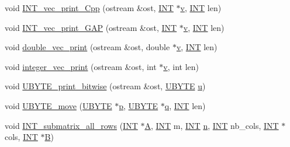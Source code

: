 \begin{DoxyCompactItemize}
\item 
void \mbox{\hyperlink{util_8_c_ad19ad515398f223bb537e4645d0a3094}{I\+N\+T\+\_\+vec\+\_\+print\+\_\+\+Cpp}} (ostream \&ost, \mbox{\hyperlink{galois_8h_a09fddde158a3a20bd2dcadb609de11dc}{I\+NT}} $\ast$\mbox{\hyperlink{simeon_8_c_aeb3f3030944801b163bc3b829a7f6710}{v}}, \mbox{\hyperlink{galois_8h_a09fddde158a3a20bd2dcadb609de11dc}{I\+NT}} len)
\item 
void \mbox{\hyperlink{util_8_c_ae2cc7aa118a0fc36468c296c4e7440f6}{I\+N\+T\+\_\+vec\+\_\+print\+\_\+\+G\+AP}} (ostream \&ost, \mbox{\hyperlink{galois_8h_a09fddde158a3a20bd2dcadb609de11dc}{I\+NT}} $\ast$\mbox{\hyperlink{simeon_8_c_aeb3f3030944801b163bc3b829a7f6710}{v}}, \mbox{\hyperlink{galois_8h_a09fddde158a3a20bd2dcadb609de11dc}{I\+NT}} len)
\item 
void \mbox{\hyperlink{util_8_c_a769d593927060ae1885b4a72aa296048}{double\+\_\+vec\+\_\+print}} (ostream \&ost, double $\ast$\mbox{\hyperlink{simeon_8_c_aeb3f3030944801b163bc3b829a7f6710}{v}}, \mbox{\hyperlink{galois_8h_a09fddde158a3a20bd2dcadb609de11dc}{I\+NT}} len)
\item 
void \mbox{\hyperlink{util_8_c_a180b6872d1a599495f3fec2f0949ec15}{integer\+\_\+vec\+\_\+print}} (ostream \&ost, int $\ast$\mbox{\hyperlink{simeon_8_c_aeb3f3030944801b163bc3b829a7f6710}{v}}, int len)
\item 
void \mbox{\hyperlink{util_8_c_a920069ee78174f219534fed767865637}{U\+B\+Y\+T\+E\+\_\+print\+\_\+bitwise}} (ostream \&ost, \mbox{\hyperlink{galois_8h_a122c4acf389c050379f00341fdcd5812}{U\+B\+Y\+TE}} \mbox{\hyperlink{alphabet2_8_c_a5874b4c2ec2e28321eea4e4871d08222}{u}})
\item 
void \mbox{\hyperlink{util_8_c_ae0491e6776a8371ca5387826b752780b}{U\+B\+Y\+T\+E\+\_\+move}} (\mbox{\hyperlink{galois_8h_a122c4acf389c050379f00341fdcd5812}{U\+B\+Y\+TE}} $\ast$\mbox{\hyperlink{alphabet2_8_c_a533391314665d6bf1b5575e9a9cd8552}{p}}, \mbox{\hyperlink{galois_8h_a122c4acf389c050379f00341fdcd5812}{U\+B\+Y\+TE}} $\ast$\mbox{\hyperlink{simeon_8_c_a92cbb483a3b27ae1a0dbfcb125ce216f}{q}}, \mbox{\hyperlink{galois_8h_a09fddde158a3a20bd2dcadb609de11dc}{I\+NT}} len)
\item 
void \mbox{\hyperlink{util_8_c_ae4c416440fc7b7e1f9741ca235d5d694}{I\+N\+T\+\_\+submatrix\+\_\+all\+\_\+rows}} (\mbox{\hyperlink{galois_8h_a09fddde158a3a20bd2dcadb609de11dc}{I\+NT}} $\ast$\mbox{\hyperlink{simeon_8_c_a97833f04c3a9c008df5521a2fc291bb4}{A}}, \mbox{\hyperlink{galois_8h_a09fddde158a3a20bd2dcadb609de11dc}{I\+NT}} m, \mbox{\hyperlink{galois_8h_a09fddde158a3a20bd2dcadb609de11dc}{I\+NT}} \mbox{\hyperlink{simeon_8_c_a7f2cd26777ce0ff3fdaf8d02aacbddfb}{n}}, \mbox{\hyperlink{galois_8h_a09fddde158a3a20bd2dcadb609de11dc}{I\+NT}} nb\+\_\+cols, \mbox{\hyperlink{galois_8h_a09fddde158a3a20bd2dcadb609de11dc}{I\+NT}} $\ast$cols, \mbox{\hyperlink{galois_8h_a09fddde158a3a20bd2dcadb609de11dc}{I\+NT}} $\ast$\mbox{\hyperlink{costas_8_c_ad1f767566c3189fb90e9cffcc5dd4680}{B}})

\end{DoxyCompactItemize}
